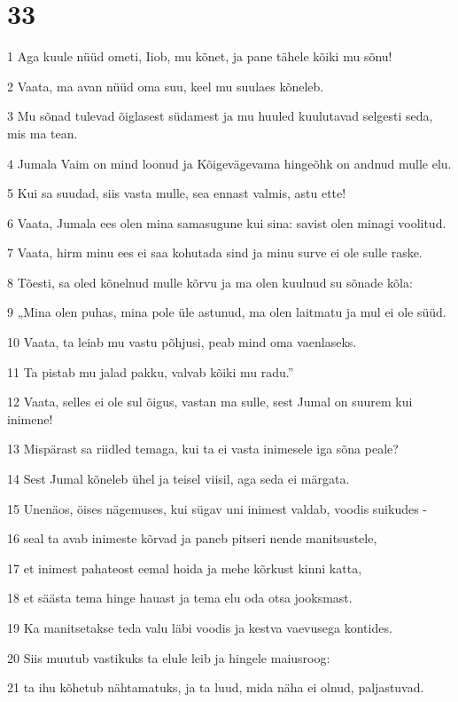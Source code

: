 \chapter{33}

\par 1 Aga kuule nüüd ometi, Iiob, mu kõnet, ja pane tähele kõiki mu sõnu!
\par 2 Vaata, ma avan nüüd oma suu, keel mu suulaes kõneleb.
\par 3 Mu sõnad tulevad õiglasest südamest ja mu huuled kuulutavad selgesti seda, mis ma tean.
\par 4 Jumala Vaim on mind loonud ja Kõigevägevama hingeõhk on andnud mulle elu.
\par 5 Kui sa suudad, siis vasta mulle, sea ennast valmis, astu ette!
\par 6 Vaata, Jumala ees olen mina samasugune kui sina: savist olen minagi voolitud.
\par 7 Vaata, hirm minu ees ei saa kohutada sind ja minu surve ei ole sulle raske.
\par 8 Tõesti, sa oled kõnelnud mulle kõrvu ja ma olen kuulnud su sõnade kõla:
\par 9 „Mina olen puhas, mina pole üle astunud, ma olen laitmatu ja mul ei ole süüd.
\par 10 Vaata, ta leiab mu vastu põhjusi, peab mind oma vaenlaseks.
\par 11 Ta pistab mu jalad pakku, valvab kõiki mu radu.”
\par 12 Vaata, selles ei ole sul õigus, vastan ma sulle, sest Jumal on suurem kui inimene!
\par 13 Mispärast sa riidled temaga, kui ta ei vasta inimesele iga sõna peale?
\par 14 Sest Jumal kõneleb ühel ja teisel viisil, aga seda ei märgata.
\par 15 Unenäos, öises nägemuses, kui sügav uni inimest valdab, voodis suikudes -
\par 16 seal ta avab inimeste kõrvad ja paneb pitseri nende manitsustele,
\par 17 et inimest pahateost eemal hoida ja mehe kõrkust kinni katta,
\par 18 et säästa tema hinge hauast ja tema elu oda otsa jooksmast.
\par 19 Ka manitsetakse teda valu läbi voodis ja kestva vaevusega kontides.
\par 20 Siis muutub vastikuks ta elule leib ja hingele maiusroog:
\par 21 ta ihu kõhetub nähtamatuks, ja ta luud, mida näha ei olnud, paljastuvad.

